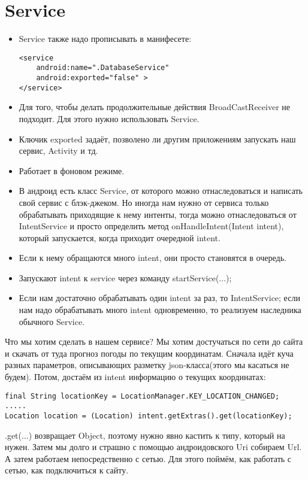 \documentclass[12 pt]{article}
\begin{document}
\section{Service}    
    \begin{itemize}
        \item Service также надо прописывать в манифесете:
        \begin{lstlisting}
<service
    android:name=".DatabaseService"
    android:exported="false" >
</service>        
        \end{lstlisting}
        \item Для того, чтобы делать продолжительные действия BroadCastReceiver не подходит. Для этого нужно использовать Service.
        \item Ключик exported задаёт, позволено ли другим приложениям запускать наш сервис, Activity и тд.
        \item Работает в фоновом режиме.
        \item В андроид есть класс Service, от которого можно отнаследоваться и написать свой сервис с блэк-джеком. Но иногда нам нужно от сервиса только обрабатывать приходящие к нему интенты, тогда можно отнаследоваться от IntentService и просто определить метод onHandleIntent(Intent intent), который запускается, когда приходит очередной intent.
        \item Если к нему обращаются много intent, они просто становятся в очередь.
        \item Запускают intent к service через команду startService(...);
        \item Если нам достаточно обрабатывать один intent за раз, то IntentService; если нам надо обрабатывать много intent одновременно, то реализуем наследника обычного Service.
    \end{itemize}
    
    Что мы хотим сделать в нашем сервисе? Мы хотим достучаться по сети до сайта и скачать от туда прогноз погоды по текущим координатам. Сначала идёт куча разных параметров, описывающих разметку json-класса(этого мы касаться не будем). Потом, достаём из intent информацию о текущих координатах: 
    \begin{lstlisting}
final String locationKey = LocationManager.KEY_LOCATION_CHANGED;
.....
Location location = (Location) intent.getExtras().get(locationKey);    
    \end{lstlisting} .get(...) возвращает Object, поэтому нужно явно кастить к типу, который на нужен. Затем мы долго и страшно с помощью андроидовского Uri собираем Url. А затем работаем непосредственно с сетью. Для этого поймём, как работать с сетью, как подключиться к сайту.
\end{document}
